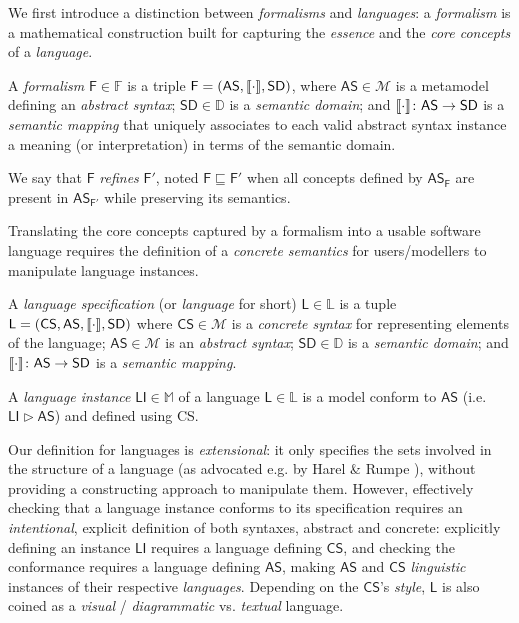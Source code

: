 \begin{olddef}
We first introduce a distinction between \emph{formalisms} and \emph{languages}: 
a \emph{formalism} is a mathematical construction built for capturing the 
\emph{essence} and the \emph{core concepts} of a \emph{language}. 

\begin{Definition}
   A \emph{formalism} $\mathsf{F}\in\mathbb{F}$ is a triple $\mathsf{F} = 
(\mathsf{AS}, 
\llbracket \cdot \rrbracket, \mathsf{SD})$, where $\mathsf{AS}\in\mathcal{M}$ is a metamodel 
defining an \emph{abstract syntax}; $\mathsf{SD}\in\mathbb{D}$ is a 
\emph{semantic domain}; and $\llbracket \cdot \rrbracket 
\colon \mathsf{AS} \to \mathsf{SD}$ is a \emph{semantic mapping} that uniquely 
associates to each valid abstract syntax instance a meaning (or interpretation) 
in terms of the semantic domain.
   
   We say that $\mathsf{F}$ \emph{refines} $\mathsf{F'}$, noted $\mathsf{F}
\sqsubseteq \mathsf{F'}$ when all concepts defined by
$\mathsf{AS}_{\mathsf{F}}$ are present in $\mathsf{AS}_{\mathsf{F'}}$ while
preserving its semantics.
\end{Definition}
Translating the core concepts captured by a formalism into a usable software 
language requires the definition of a \emph{concrete semantics} for 
users/modellers to manipulate language instances.

\begin{Definition}
   A \emph{language specification} (or \emph{language} 
for short) $\mathsf{L}\in\mathbb{L}$ is a tuple $\mathsf{L} = (\mathsf{CS}, 
\mathsf{AS}, \llbracket \cdot \rrbracket, \mathsf{SD})$ where $\mathsf{CS}\in\mathcal{M}$ is a 
\emph{concrete syntax} for representing elements of the language;  
$\mathsf{AS}\in\mathcal{M}$ is an \emph{abstract syntax}; 
$\mathsf{SD}\in\mathbb{D}$ is 
a \emph{semantic domain}; and $\llbracket \cdot \rrbracket \colon \mathsf{AS} \to \mathsf{SD}$ is 
a \emph{semantic mapping}. 

   A \emph{language instance} $\mathsf{LI}\in\mathbb{M}$ of a language
$\mathsf{L}\in\mathbb{L}$ is a model conform to $\mathsf{AS}$ (i.e.
$\mathsf{LI} \rhd \mathsf{AS}$) and defined using \textsf{CS}.
\end{Definition}

\smallskip\noindent
Our definition for languages is \emph{extensional}: it only specifies the sets 
involved in the structure of a language (as advocated e.g. by Harel \& Rumpe 
\cite{J:Harel-Rumpe:2004}), without providing a constructing approach to 
manipulate them. However, effectively checking that a language instance 
conforms to its specification requires an \emph{intentional}, explicit 
definition of both syntaxes, abstract and concrete: explicitly defining an 
instance $\mathsf{LI}$ requires a language defining $\mathsf{CS}$, and checking 
the conformance requires a language defining $\mathsf{AS}$, making 
$\mathsf{AS}$ and $\mathsf{CS}$ \emph{linguistic} instances of their respective 
\emph{languages}. Depending on the $\mathsf{CS}$'s \emph{style}, $\mathsf{L}$ 
is also coined as a \emph{visual} / \emph{diagrammatic} vs. \emph{textual} 
language.
\end{olddef}

